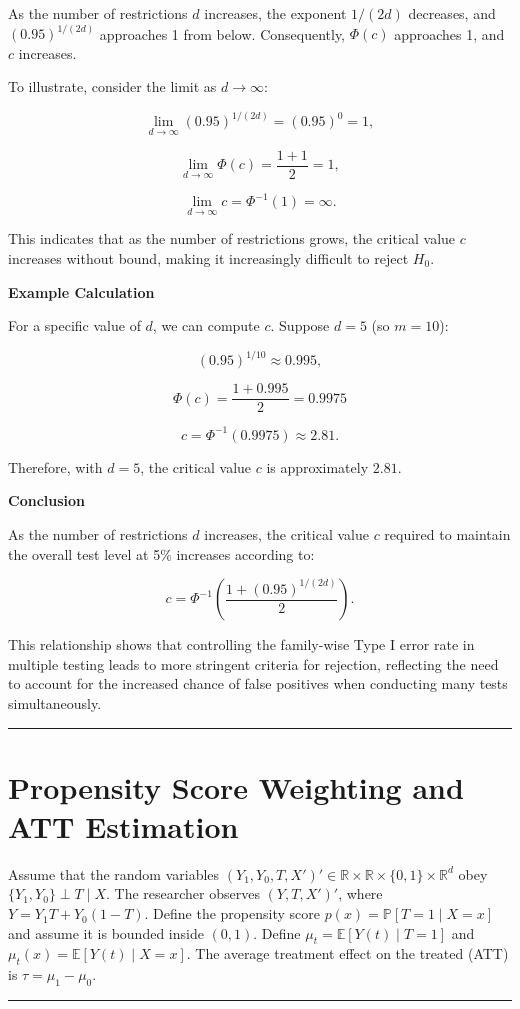 \documentclass{article}
\newenvironment{colorparagraph}[1]{\par\color{#1}}{\par}
\begin{document}
As the number of restrictions \( d \) increases, the exponent \( 1/(2d) \) decreases, and \( (0.95)^{1/(2d)} \) approaches 1 from below. Consequently, \( \Phi(c) \) approaches 1, and \( c \) increases.

To illustrate, consider the limit as \( d \to \infty \):

\[
\lim_{d \to \infty} (0.95)^{1/(2d)} = (0.95)^{0} = 1,
\]

\[
\lim_{d \to \infty} \Phi(c) = \frac{1 + 1}{2} = 1,
\]

\[
\lim_{d \to \infty} c = \Phi^{-1}(1) = \infty.
\]

This indicates that as the number of restrictions grows, the critical value \( c \) increases without bound, making it increasingly difficult to reject \( H_0 \).

\textbf{Example Calculation}

For a specific value of \( d \), we can compute \( c \). Suppose \( d = 5 \) (so \( m = 10 \)):

\[
(0.95)^{1/10} \approx 0.995,
\]

\[
\Phi(c) = \frac{1 + 0.995}{2} = 0.9975
\]

\[
c = \Phi^{-1}(0.9975) \approx 2.81.
\]

Therefore, with \( d = 5 \), the critical value \( c \) is approximately \( 2.81 \).

\textbf{Conclusion}

As the number of restrictions \( d \) increases, the critical value \( c \) required to maintain the overall test level at 5\% increases according to:

\[
c = \Phi^{-1}\left( \frac{1 + (0.95)^{1/(2d)}}{2} \right).
\]

This relationship shows that controlling the family-wise Type I error rate in multiple testing leads to more stringent criteria for rejection, reflecting the need to account for the increased chance of false positives when conducting many tests simultaneously.

\begin{colorparagraph}{questioncolor}
\rule{\textwidth}{0.5pt}

\label{q2}\section{Propensity Score Weighting and ATT Estimation}

Assume that the random variables \( (Y_1, Y_0, T, X')' \in \mathbb{R} \times \mathbb{R} \times \{0, 1\} \times \mathbb{R}^d \) obey \( \{Y_1, Y_0\} \perp T \mid X \). The researcher observes \( (Y, T, X')' \), where \( Y = Y_1 T + Y_0(1 - T) \). Define the propensity score \( p(x) = \mathbb{P}[T = 1 \mid X = x] \) and assume it is bounded inside \( (0,1) \). Define \( \mu_t = \mathbb{E}[Y(t) \mid T = 1] \) and \( \mu_t(x) = \mathbb{E}[Y(t) \mid X = x] \). The average treatment effect on the treated (ATT) is \( \tau = \mu_1 - \mu_0 \).

\rule{\textwidth}{0.5pt}
\end{colorparagraph}
\end{document}

